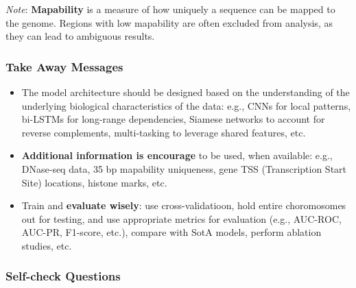 \documentclass[a4paper]{article}
\begin{document}
\textit{Note}: \textbf{Mapability} is a measure of how uniquely a sequence can be  
mapped to the genome. Regions with low mapability are often excluded from
analysis, as they can lead to ambiguous results.

\subsubsection*{Take Away Messages}

\begin{itemize}
  \item The model architecture should be designed based on the understanding of the 
  underlying biological characteristics of the data: e.g., CNNs for local patterns,
  bi-LSTMs for long-range dependencies, Siamese networks to account for reverse
  complements, multi-tasking to leverage shared features, etc.

  \item \textbf{Additional information is encourage} to be used, when available: e.g., DNase-seq
  data, 35 bp mapability uniqueness, gene TSS (Transcription Start Site) locations,
  histone marks, etc.

  \item Train and \textbf{evaluate wisely}: use cross-validatioon, hold entire choromosomes
  out for testing, and use appropriate metrics for evaluation (e.g., AUC-ROC, AUC-PR,
  F1-score, etc.), compare with SotA models, perform ablation studies, etc.
\end{itemize}

\subsubsection*{Self-check Questions}
\end{document}
